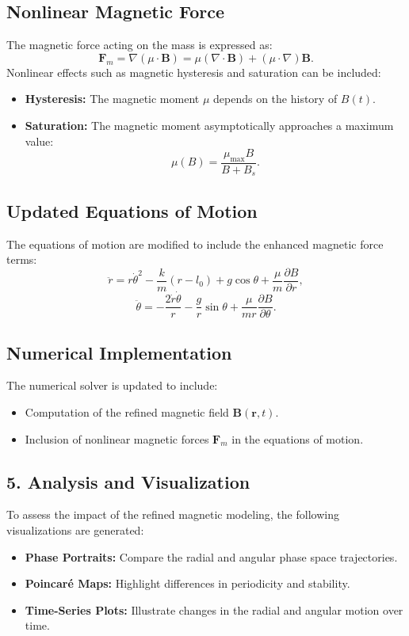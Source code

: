 \documentclass[12pt]{article}
\begin{document}
\subsection{Nonlinear Magnetic Force}
The magnetic force acting on the mass is expressed as:
\[
\mathbf{F}_m = \nabla (\mu \cdot \mathbf{B}) = \mu (\nabla \cdot \mathbf{B}) + (\mu \cdot \nabla) \mathbf{B}.
\]
Nonlinear effects such as magnetic hysteresis and saturation can be included:
\begin{itemize}
    \item \textbf{Hysteresis:} The magnetic moment \( \mu \) depends on the history of \( B(t) \).
    \item \textbf{Saturation:} The magnetic moment asymptotically approaches a maximum value:
    \[
    \mu(B) = \frac{\mu_{\text{max}} B}{B + B_s}.
    \]
\end{itemize}

\subsection{Updated Equations of Motion}
The equations of motion are modified to include the enhanced magnetic force terms:
\[
\ddot{r} = r \dot{\theta}^2 - \frac{k}{m}(r - l_0) + g \cos\theta + \frac{\mu}{m} \frac{\partial B}{\partial r},
\]
\[
\ddot{\theta} = -\frac{2 \dot{r} \dot{\theta}}{r} - \frac{g}{r} \sin\theta + \frac{\mu}{m r} \frac{\partial B}{\partial \theta}.
\]

\subsection{Numerical Implementation}
The numerical solver is updated to include:
\begin{itemize}
    \item Computation of the refined magnetic field \( \mathbf{B}(\mathbf{r}, t) \).
    \item Inclusion of nonlinear magnetic forces \( \mathbf{F}_m \) in the equations of motion.
\end{itemize}

\subsection*{5. Analysis and Visualization}
To assess the impact of the refined magnetic modeling, the following visualizations are generated:
\begin{itemize}
    \item \textbf{Phase Portraits:} Compare the radial and angular phase space trajectories.
    \item \textbf{Poincaré Maps:} Highlight differences in periodicity and stability.
    \item \textbf{Time-Series Plots:} Illustrate changes in the radial and angular motion over time.
\end{itemize}
\end{document}
